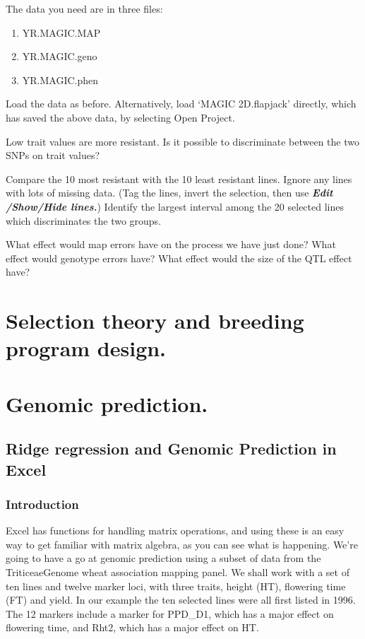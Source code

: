 \documentclass[
]{book}
\providecommand{\tightlist}{%
  \setlength{\itemsep}{0pt}\setlength{\parskip}{0pt}}
\begin{document}
The data you need are in three files:

\begin{enumerate}
\def\labelenumi{\arabic{enumi}.}
\tightlist
\item
  YR.MAGIC.MAP
\item
  YR.MAGIC.geno
\item
  YR.MAGIC.phen
\end{enumerate}

Load the data as before. Alternatively, load `MAGIC 2D.flapjack' directly, which has saved the above data, by selecting Open Project.

Low trait values are more resistant. Is it possible to discriminate between the two SNPs on trait values?

Compare the 10 most resistant with the 10 least resistant lines. Ignore any lines with lots of missing data. (Tag the lines, invert the selection, then use \textbf{\emph{Edit /Show/Hide lines.}}) Identify the largest interval among the 20 selected lines which discriminates the two groups.

What effect would map errors have on the process we have just done?
What effect would genotype errors have?
What effect would the size of the QTL effect have?

\hypertarget{selection-theory}{%
\chapter{Selection theory and breeding program design.}\label{selection-theory}}

\hypertarget{Genomic-prediction}{%
\chapter{Genomic prediction.}\label{Genomic-prediction}}

\hypertarget{ridge-regression-and-genomic-prediction-in-excel}{%
\section{Ridge regression and Genomic Prediction in Excel}\label{ridge-regression-and-genomic-prediction-in-excel}}

\hypertarget{introduction-3}{%
\subsection{Introduction}\label{introduction-3}}

Excel has functions for handling matrix operations, and using these is an easy way to get familiar with matrix algebra, as you can see what is happening. We're going to have a go at genomic prediction using a subset of data from the TriticeaeGenome wheat association mapping panel. We shall work with a set of ten lines and twelve marker loci, with three traits, height (HT), flowering time (FT) and yield. In our example the ten selected lines were all first listed in 1996. The 12 markers include a marker for PPD\_D1, which has a major effect on flowering time, and Rht2, which has a major effect on HT.
\end{document}

